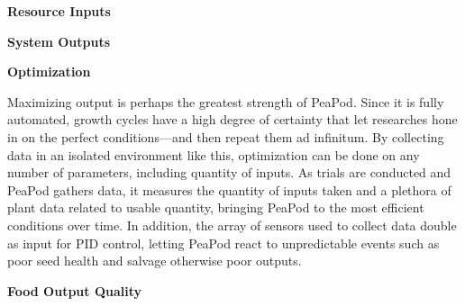 \documentclass{report}
\begin{document}
\textbf{Resource Inputs}
\label{sec:resource-inputs}





\textbf{System Outputs}
\label{sec:resource-outputs}





\textbf{Optimization}
\label{sec:resource-optimization}




Maximizing output is perhaps the greatest strength of PeaPod. Since it is fully automated, growth cycles have a high degree of certainty that let researches hone in on the perfect conditions---and then repeat them ad infinitum.
By collecting data in an isolated environment like this, optimization can be done on any number of parameters, including quantity of inputs. As trials are conducted and PeaPod gathers data, it measures the quantity of inputs taken and a plethora of plant data related to usable quantity, bringing PeaPod to the most efficient conditions over time.
In addition, the array of sensors used to collect data double as input for PID control, letting PeaPod react to unpredictable events such as poor seed health and salvage otherwise poor outputs.

\textbf{Food Output Quality}
\label{sec:resource-outputquality}
\end{document}
